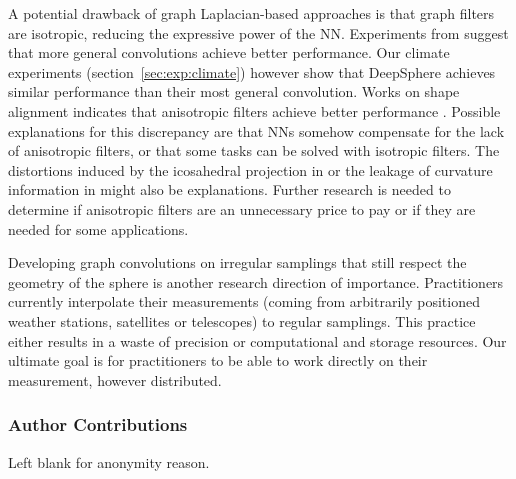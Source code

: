 \documentclass{article} %
\newcommand{\todo}[1]{{\color[rgb]{.6,.1,.6}{#1}}}
\renewcommand{\secref}[1]{section~\ref{sec:#1}}
\begin{document}
A potential drawback of graph Laplacian-based approaches is that graph filters are isotropic, reducing the expressive power of the NN.
Experiments from \citet{cohen2019gauge} suggest that more general convolutions achieve better performance.
Our climate experiments (\secref{exp:climate}) however show that DeepSphere achieves similar performance than their most general convolution.
Works on shape alignment indicates that anisotropic filters achieve better performance \todo{[Bronstein]}.
Possible explanations for this discrepancy are that NNs somehow compensate for the lack of anisotropic filters, or that some tasks can be solved with isotropic filters.
The distortions induced by the icosahedral projection in \citep{cohen2019gauge} or the leakage of curvature information in \todo{[Bronstein]} might also be explanations.
Further research is needed to determine if anisotropic filters are an unnecessary price to pay or if they are needed for some applications.

Developing graph convolutions on irregular samplings that still respect the geometry of the sphere is another research direction of importance.
Practitioners currently interpolate their measurements (coming from arbitrarily positioned weather stations, satellites or telescopes) to regular samplings.
This practice either results in a waste of precision or computational and storage resources.
Our ultimate goal is for practitioners to be able to work directly on their measurement, however distributed.



\newpage
\subsubsection*{Author Contributions}
Left blank for anonymity reason.
\end{document}
